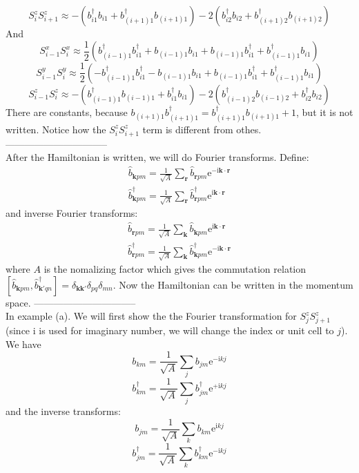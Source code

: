 \documentclass[letterpaper,10pt]{article}
\newcommand{\e}{\mathrm{e}}
\newcommand{\ii}{\mathrm{i}}
\begin{document}
$$
    S_{i}^z S_{i+1}^z \approx-\left(b_{i1}^{\dagger}b_{i1}+b_{(i+1)1}^{\dagger}b_{(i+1)1}\right)-2\left(b_{i2}^{\dagger}b_{i2}+b_{(i+1)2}^{\dagger}b_{(i+1)2}\right)
$$
And $$
S_{i-1}^x S_{i}^x  \approx\frac{1}{2}\left(b_{(i-1)1}^{\dagger}b_{i1}^{\dagger}+b_{(i-1)1}b_{i1}+b_{(i-1)1}b_{i1}^{\dagger}+b_{(i-1)1}^{\dagger}b_{i1}\right)
$$
$$
S_{i-1}^y S_{i}^y \approx\frac{1}{2}\left(-b_{(i-1)1}^{\dagger}b_{i1}^{\dagger}-b_{(i-1)1}b_{i1}+b_{(i-1)1}b_{i1}^{\dagger}+b_{(i-1)1}^{\dagger}b_{i1}\right)
$$
$$
    S_{i-1}^z S_{i}^z \approx-\left(b_{(i-1)1}^{\dagger}b_{(i-1)1}+b_{i1}^{\dagger}b_{i1}\right)-2\left(b_{(i-1)2}^{\dagger}b_{(i-1)2}+b_{i2}^{\dagger}b_{i2}\right)
$$
There are constants, because $b_{(i+1)1}b_{(i+1)1}^{\dagger}=b_{(i+1)1}^{\dagger}b_{(i+1)1}+1$, but it is not written. Notice how the $S_{i}^z S_{i+1}^z$  term is different from othes.\\
--------------------------------\\
After the Hamiltonian is written, we will do Fourier transforms. Define:
$$ \begin{aligned}
    \hat{b}_{\bm{k}pm}=\frac{1}{\sqrt{A}}\sum_{\bm{r}}\hat{b}_{\bm{r}pm}\e^{-\ii\bm{k}\cdot\bm{r}} \\
    \hat{b}_{\bm{k}pm}^{\dagger}=\frac{1}{\sqrt{A}}\sum_{\bm{r}}\hat{b}_{\bm{r}pm}^{\dagger}\e^{\ii\bm{k}\cdot\bm{r}}
    \end{aligned} $$
and inverse Fourier transforms:
$$ \begin{aligned}
    \hat{b}_{\bm{r}pm}=\frac{1}{\sqrt{A}}\sum_{\bm{k}}\hat{b}_{\bm{k}pm}\e^{\ii\bm{k}\cdot\bm{r}} \\
    \hat{b}_{\bm{r}pm}^{\dagger}=\frac{1}{\sqrt{A}}\sum_{\bm{k}}\hat{b}_{\bm{k}pm}^{\dagger}\e^{-\ii\bm{k}\cdot\bm{r}}
    \end{aligned} $$
where $A$ is the nomalizing factor which gives the commutation relation $\left[\hat{b}_{\bm{k}pm},\hat{b}_{\bm{k'}qn}^{\dagger}\right]=\delta_{\bm{k}\bm{k}'}\delta_{pq}\delta_{mn}$. Now the Hamiltonian can be written in the momentum space.
--------------------------------\\
In example (a). 
We will first show the the Fourier transformation for $S_j^z S_{j+1}^z$(since i is used for imaginary number, we will change the index or unit cell to $j$).
We have $$
b_{km}=\frac{1}{\sqrt{A}}\sum_{j}b_{jm}\e^{-\ii k j}
$$$$
b^{\dagger}_{km}=\frac{1}{\sqrt{A}}\sum_{j}b_{jm}^{\dagger}\e^{+\ii k j}
$$
and the inverse transforms:$$
b_{jm}=\frac{1}{\sqrt{A}}\sum_{k}b_{km}\e^{\ii k j}
$$$$
b^{\dagger}_{jm}=\frac{1}{\sqrt{A}}\sum_{k}b_{km}^{\dagger}\e^{-\ii k j}
$$
\end{document}
